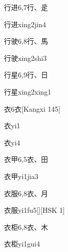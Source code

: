 \begin{entry}{行进}{6,7}{⾏、⾡}
  \begin{phonetics}{行进}{xing2jin4}
  \end{phonetics}
\end{entry}

\begin{entry}{行驶}{6,8}{⾏、⾺}
  \begin{phonetics}{行驶}{xing2shi3}
  \end{phonetics}
\end{entry}

\begin{entry}{行星}{6,9}{⾏、⽇}
  \begin{phonetics}{行星}{xing2xing1}
  \end{phonetics}
\end{entry}

\begin{entry}{衣}{6}{⾐}[Kangxi 145]
  \begin{phonetics}{衣}{yi1}
  \end{phonetics}
  \begin{phonetics}{衣}{yi4}
  \end{phonetics}
\end{entry}

\begin{entry}{衣甲}{6,5}{⾐、⽥}
  \begin{phonetics}{衣甲}{yi1jia3}
  \end{phonetics}
\end{entry}

\begin{entry}{衣服}{6,8}{⾐、⽉}
  \begin{phonetics}{衣服}{yi1fu5}[][HSK 1]
  \end{phonetics}
\end{entry}

\begin{entry}{衣柜}{6,8}{⾐、⽊}
  \begin{phonetics}{衣柜}{yi1gui4}
  \end{phonetics}
\end{entry}

